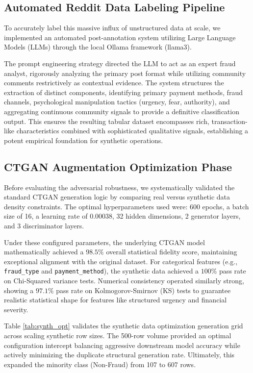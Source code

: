 \documentclass[conference]{IEEEtran}
\begin{document}
\subsection{Automated Reddit Data Labeling Pipeline}
To accurately label this massive influx of unstructured data at scale, we implemented an automated post-annotation system utilizing Large Language Models (LLMs) through the local Ollama framework (llama3). 

The prompt engineering strategy directed the LLM to act as an expert fraud analyst, rigorously analyzing the primary post format while utilizing community comments restrictively as contextual evidence. The system structures the extraction of distinct components, identifying primary payment methods, fraud channels, psychological manipulation tactics (urgency, fear, authority), and aggregating continuous community signals to provide a definitive classification output. This ensures the resulting tabular dataset encompasses rich, transaction-like characteristics combined with sophisticated qualitative signals, establishing a potent empirical foundation for synthetic operations.

\subsection{CTGAN Augmentation Optimization Phase}
Before evaluating the adversarial robustness, we systematically validated the standard CTGAN generation logic by comparing real versus synthetic data density constraints. The optimal hyperparameters used were: 600 epochs, a batch size of 16, a learning rate of 0.00038, 32 hidden dimensions, 2 generator layers, and 3 discriminator layers.

Under these configured parameters, the underlying CTGAN model mathematically achieved a $98.5\%$ overall statistical fidelity score, maintaining exceptional alignment with the original dataset. For categorical features (e.g., \texttt{fraud\_type} and \texttt{payment\_method}), the synthetic data achieved a $100\%$ pass rate on Chi-Squared variance tests. Numerical consistency operated similarly strong, showing a $97.1\%$ pass rate on Kolmogorov-Smirnov (KS) tests to guarantee realistic statistical shape for features like structured urgency and financial severity. 

Table \ref{tab:synth_opt} validates the synthetic data optimization generation grid across scaling synthetic row sizes. The 500-row volume provided an optimal configuration intercept balancing aggressive downstream model accuracy while actively minimizing the duplicate structural generation rate. Ultimately, this expanded the minority class (Non-Fraud) from 107 to 607 rows.
\end{document}
